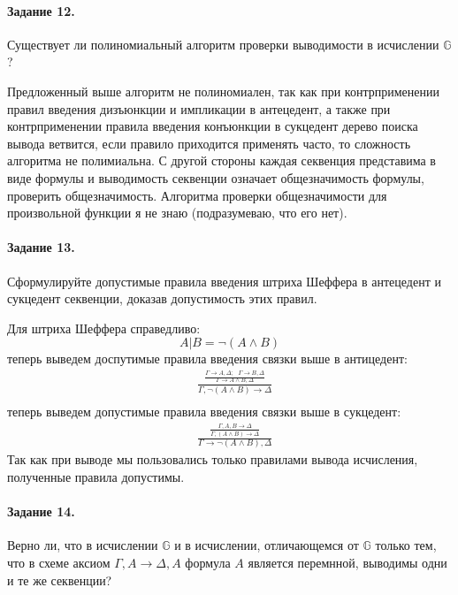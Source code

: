 \documentclass[a4paper,12pt]{article}
\begin{document}
\paragraph{Задание 12.} Существует ли полиномиальный алгоритм проверки выводимости в исчислении $\mathbb{G}$?

\begin{Solution}
Предложенный выше алгоритм не полиномиален, так как при контрприменении правил введения дизъюнкции и импликации в антецедент, а также при контрприменении правила введения конъюнкции в сукцедент дерево поиска вывода ветвится, если правило приходится применять часто, то сложность алгоритма не полимиальна. С другой стороны каждая секвенция представима в виде формулы и выводимость секвенции означает общезначимость формулы, проверить общезначимость. Алгоритма проверки общезначимости для произвольной функции я не знаю (подразумеваю, что его нет).
\end{Solution}

\paragraph{Задание 13.} Сформулируйте допустимые правила введения штриха Шеффера в антецедент и сукцедент секвенции, доказав допустимость этих правил.

\begin{Solution}
Для штриха Шеффера справедливо:
\[
	A | B = \neg\left(A \land B\right)
\]
теперь выведем доспутимые правила введения связки выше в антицедент:
\[
	\begin{split}
		&\frac{\frac{\Gamma \rightarrow A, \Delta; ~~~ \Gamma \rightarrow B, \Delta}{\Gamma \rightarrow A\land B, \Delta}}{\Gamma, \neg\left(A \land B\right) \rightarrow \Delta} \\
	\end{split}
\]
теперь выведем допустимые правила введения связки выше в сукцедент:
\[
	\begin{split}
		& \frac{\frac{\Gamma, A, B \rightarrow \Delta}{\Gamma, \left(A \land B\right) \rightarrow \Delta}}{\Gamma \rightarrow \neg\left(A \land B\right), \Delta}
	\end{split}
\]
Так как при выводе мы пользовались только правилами вывода исчисления, полученные правила допустимы.
\end{Solution}

\paragraph{Задание 14.} Верно ли, что в исчислении $\mathbb{G}$ и в исчислении, отличающемся от $\mathbb{G}$ только тем, что в схеме аксиом $\Gamma, A \rightarrow \Delta, A$ формула $A$ является перемнной, выводимы одни и те же секвенции?
\end{document}
